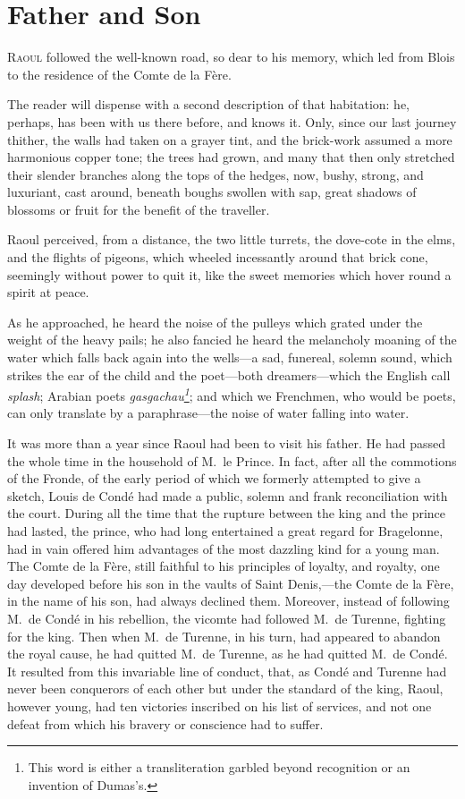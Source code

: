 \chapter{Father and Son}

\lettrine{R}{aoul} followed the well-known road, so dear to his memory, which led from Blois to the residence of the Comte de la Fère.

\zz
The reader will dispense with a second description of that habitation: he, perhaps, has been with us there before, and knows it. Only, since our last journey thither, the walls had taken on a grayer tint, and the brick-work assumed a more harmonious copper tone; the trees had grown, and many that then only stretched their slender branches along the tops of the hedges, now, bushy, strong, and luxuriant, cast around, beneath boughs swollen with sap, great shadows of blossoms or fruit for the benefit of the traveller.

Raoul perceived, from a distance, the two little turrets, the dove-cote in the elms, and the flights of pigeons, which wheeled incessantly around that brick cone, seemingly without power to quit it, like the sweet memories which hover round a spirit at peace.

As he approached, he heard the noise of the pulleys which grated under the weight of the heavy pails; he also fancied he heard the melancholy moaning of the water which falls back again into the wells—a sad, funereal, solemn sound, which strikes the ear of the child and the poet—both dreamers—which the English call \textit{splash}; Arabian poets \textit{gasgachau\footnote{This word is either a transliteration garbled beyond recognition or an invention of Dumas's.}}; and which we Frenchmen, who would be poets, can only translate by a paraphrase—the noise of water falling into water.

It was more than a year since Raoul had been to visit his father. He had passed the whole time in the household of M.~le Prince. In fact, after all the commotions of the Fronde, of the early period of which we formerly attempted to give a sketch, Louis de Condé had made a public, solemn and frank reconciliation with the court. During all the time that the rupture between the king and the prince had lasted, the prince, who had long entertained a great regard for Bragelonne, had in vain offered him advantages of the most dazzling kind for a young man. The Comte de la Fère, still faithful to his principles of loyalty, and royalty, one day developed before his son in the vaults of Saint Denis,—the Comte de la Fère, in the name of his son, had always declined them. Moreover, instead of following M.~de Condé in his rebellion, the vicomte had followed M.~de Turenne, fighting for the king. Then when M.~de Turenne, in his turn, had appeared to abandon the royal cause, he had quitted M.~de Turenne, as he had quitted M.~de Condé. It resulted from this invariable line of conduct, that, as Condé and Turenne had never been conquerors of each other but under the standard of the king, Raoul, however young, had ten victories inscribed on his list of services, and not one defeat from which his bravery or conscience had to suffer.

